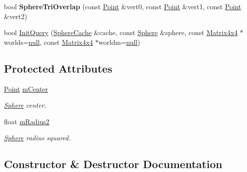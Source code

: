 \begin{DoxyCompactItemize}
\item 
bool {\bfseries Sphere\+Tri\+Overlap} (const \hyperlink{classOpcode_1_1Point}{Point} \&vert0, const \hyperlink{classOpcode_1_1Point}{Point} \&vert1, const \hyperlink{classOpcode_1_1Point}{Point} \&vert2)\hypertarget{classOpcode_1_1SphereCollider_a7fc9348689d5e372e5539312810057dc}{}\label{classOpcode_1_1SphereCollider_a7fc9348689d5e372e5539312810057dc}

\item 
bool \hyperlink{classOpcode_1_1SphereCollider_a06a934db23544e0747cf9772c0cfdcbf}{Init\+Query} (\hyperlink{structOpcode_1_1SphereCache}{Sphere\+Cache} \&cache, const \hyperlink{classOpcode_1_1Sphere}{Sphere} \&sphere, const \hyperlink{classOpcode_1_1Matrix4x4}{Matrix4x4} $\ast$worlds=\hyperlink{IceTypes_8h_ac97b8ee753e4405397a42ad5799b0f9e}{null}, const \hyperlink{classOpcode_1_1Matrix4x4}{Matrix4x4} $\ast$worldm=\hyperlink{IceTypes_8h_ac97b8ee753e4405397a42ad5799b0f9e}{null})
\end{DoxyCompactItemize}
\subsection*{Protected Attributes}
\begin{DoxyCompactItemize}
\item 
\hyperlink{classOpcode_1_1Point}{Point} \hyperlink{classOpcode_1_1SphereCollider_a8e30411e77a64668ce3a5d40822fc4d1}{m\+Center}\hypertarget{classOpcode_1_1SphereCollider_a8e30411e77a64668ce3a5d40822fc4d1}{}\label{classOpcode_1_1SphereCollider_a8e30411e77a64668ce3a5d40822fc4d1}

\begin{DoxyCompactList}\small\item\em \hyperlink{classOpcode_1_1Sphere}{Sphere} center. \end{DoxyCompactList}\item 
float \hyperlink{classOpcode_1_1SphereCollider_a9ce22daca40f942f4ce4e3bbc483149c}{m\+Radius2}\hypertarget{classOpcode_1_1SphereCollider_a9ce22daca40f942f4ce4e3bbc483149c}{}\label{classOpcode_1_1SphereCollider_a9ce22daca40f942f4ce4e3bbc483149c}

\begin{DoxyCompactList}\small\item\em \hyperlink{classOpcode_1_1Sphere}{Sphere} radius squared. \end{DoxyCompactList}\end{DoxyCompactItemize}


\subsection{Constructor \& Destructor Documentation}
